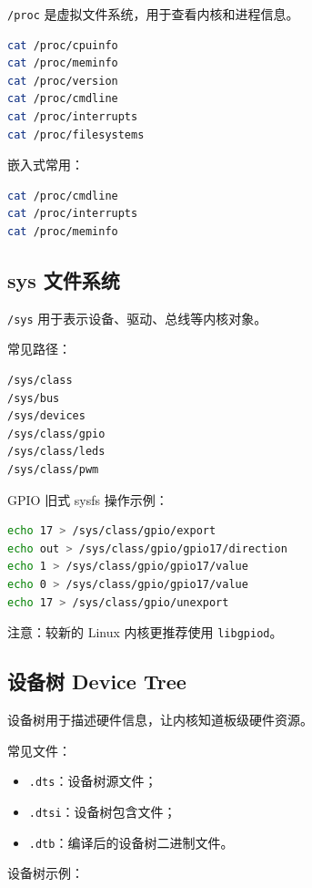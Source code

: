 \documentclass[UTF8,a4paper,12pt]{ctexart}
\begin{document}
\texttt{/proc} 是虚拟文件系统，用于查看内核和进程信息。

\begin{lstlisting}[language=bash]
cat /proc/cpuinfo
cat /proc/meminfo
cat /proc/version
cat /proc/cmdline
cat /proc/interrupts
cat /proc/filesystems
\end{lstlisting}

嵌入式常用：

\begin{lstlisting}[language=bash]
cat /proc/cmdline
cat /proc/interrupts
cat /proc/meminfo
\end{lstlisting}

\subsection{sys 文件系统}

\texttt{/sys} 用于表示设备、驱动、总线等内核对象。

常见路径：

\begin{lstlisting}[language=bash]
/sys/class
/sys/bus
/sys/devices
/sys/class/gpio
/sys/class/leds
/sys/class/pwm
\end{lstlisting}

GPIO 旧式 sysfs 操作示例：

\begin{lstlisting}[language=bash]
echo 17 > /sys/class/gpio/export
echo out > /sys/class/gpio/gpio17/direction
echo 1 > /sys/class/gpio/gpio17/value
echo 0 > /sys/class/gpio/gpio17/value
echo 17 > /sys/class/gpio/unexport
\end{lstlisting}

注意：较新的 Linux 内核更推荐使用 \texttt{libgpiod}。

\subsection{设备树 Device Tree}

设备树用于描述硬件信息，让内核知道板级硬件资源。

常见文件：
\begin{itemize}
    \item \texttt{.dts}：设备树源文件；
    \item \texttt{.dtsi}：设备树包含文件；
    \item \texttt{.dtb}：编译后的设备树二进制文件。
\end{itemize}

设备树示例：
\end{document}
